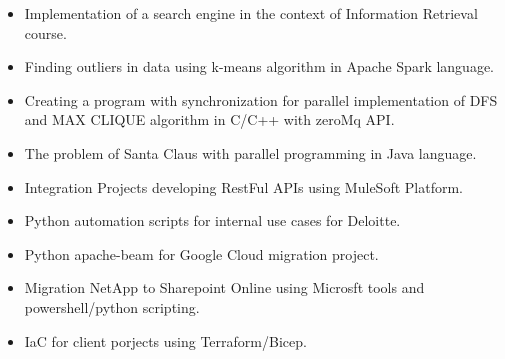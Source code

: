 \documentclass[a4paper,10pt]{article}
\begin{document}
\begin{itemize}[leftmargin=150pt]
        \item Implementation of a search engine in the context of Information Retrieval course.
        
\end{itemize}
\begin{itemize}[leftmargin=150pt]
        \item 	Finding outliers in data using k-means algorithm in Apache Spark language.
        
\end{itemize}
\begin{itemize}[leftmargin=150pt]
        \item Creating a program with synchronization for parallel implementation of DFS and MAX CLIQUE algorithm in C/C++ with zeroMq API.
        
\end{itemize}
\begin{itemize}[leftmargin=150pt]
        \item  The problem of Santa Claus with parallel programming in Java language.
        
\end{itemize}
\begin{itemize}[leftmargin=150pt]
        \item  Integration Projects developing RestFul APIs using MuleSoft Platform.
        
\end{itemize}
\begin{itemize}[leftmargin=150pt]
        \item  Python automation scripts for internal use cases for Deloitte.
        
\end{itemize}
\begin{itemize}[leftmargin=150pt]
        \item  Python apache-beam for Google Cloud migration project.
        
\end{itemize}
\begin{itemize}[leftmargin=150pt]
        \item  Migration NetApp to Sharepoint Online using Microsft tools and powershell/python scripting.
        
\end{itemize}
\begin{itemize}[leftmargin=150pt]
        \item  IaC for client porjects using Terraform/Bicep.
        
\end{itemize}
\end{document}
